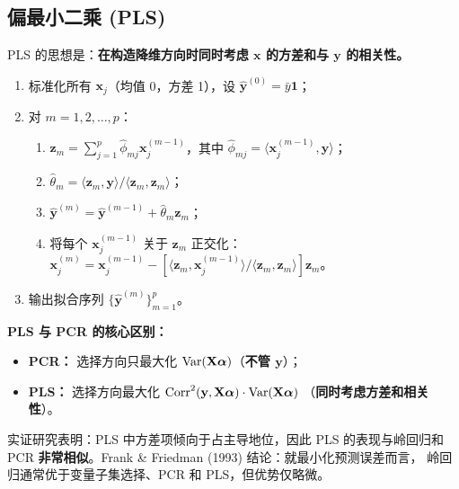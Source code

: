 \subsection{偏最小二乘 (PLS)}

PLS 的思想是：\textbf{在构造降维方向时同时考虑 $\mathbf{x}$ 的方差和与 $\mathbf{y}$ 的相关性。}

\begin{definition}
\begin{enumerate}[label=第 \arabic* 步：, leftmargin=*]
    \item 标准化所有 $\mathbf{x}_j$（均值 0，方差 1），设 $\hat{\mathbf{y}}^{(0)} = \bar{y}\mathbf{1}$；
    \item 对 $m = 1, 2, \dots, p$：
    \begin{enumerate}
        \item[(a)] $\mathbf{z}_m = \sum_{j=1}^{p} \hat{\phi}_{mj} \mathbf{x}_j^{(m-1)}$，其中
        $\hat{\phi}_{mj} = \langle \mathbf{x}_j^{(m-1)}, \mathbf{y} \rangle$；
        \item[(b)] $\hat{\theta}_m = \langle \mathbf{z}_m, \mathbf{y} \rangle / \langle \mathbf{z}_m, \mathbf{z}_m \rangle$；
        \item[(c)] $\hat{\mathbf{y}}^{(m)} = \hat{\mathbf{y}}^{(m-1)} + \hat{\theta}_m \mathbf{z}_m$；
        \item[(d)] 将每个 $\mathbf{x}_j^{(m-1)}$ 关于 $\mathbf{z}_m$ 正交化：
        $\mathbf{x}_j^{(m)} = \mathbf{x}_j^{(m-1)} - [\langle \mathbf{z}_m, \mathbf{x}_j^{(m-1)} \rangle / \langle \mathbf{z}_m, \mathbf{z}_m \rangle] \mathbf{z}_m$。
    \end{enumerate}
    \item 输出拟合序列 $\{\hat{\mathbf{y}}^{(m)}\}_{m=1}^{p}$。
\end{enumerate}
\end{definition}

\textbf{PLS 与 PCR 的核心区别：}
\begin{itemize}
    \item \textbf{PCR：} 选择方向只最大化 $\mathrm{Var}(\mathbf{X}\bm{\alpha})$（\textbf{不管 $\mathbf{y}$}）；
    \item \textbf{PLS：} 选择方向最大化 $\mathrm{Corr}^2(\mathbf{y}, \mathbf{X}\bm{\alpha}) \cdot \mathrm{Var}(\mathbf{X}\bm{\alpha})$
    （\textbf{同时考虑方差和相关性}）。
\end{itemize}

实证研究表明：PLS 中方差项倾向于占主导地位，因此 PLS 的表现与岭回归和 PCR
\textbf{非常相似}。Frank \& Friedman (1993) 结论：就最小化预测误差而言，
岭回归通常优于变量子集选择、PCR 和 PLS，但优势仅略微。

